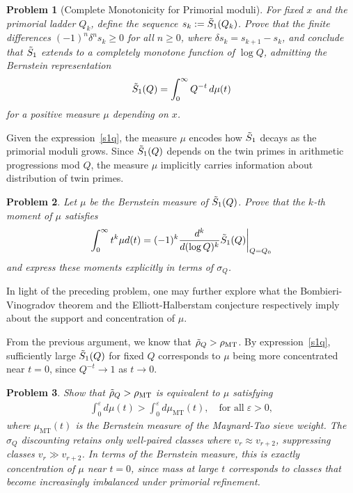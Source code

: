 \documentclass[11pt,reqno]{amsart}
\theoremstyle{plain}\newtheorem{theorem}{Theorem}[section]
\newtheorem{problem}{Problem}[section]
\numberwithin{equation}{section}
\begin{document}
\begin{problem}[Complete Monotonicity for Primorial moduli]\label{1}
For fixed $x$ and the primorial ladder $Q_k$, define the sequence $s_k:=\Tilde{S}_1(Q_k)$. Prove that the finite differences $(-1)^n \delta^n s_k \geq 0$ for all $n \geq 0$, where $\delta s_k = s_{k+1}-s_k$, and conclude that $\Tilde{S}_1$ extends to a completely monotone function of $\log Q$, admitting the Bernstein representation
\begin{align}\label{s1q}
\Tilde{S}_1(Q) 
=\int_0^\infty Q^{-t}\, d\mu(t)    
\end{align}
for a positive measure $\mu$ depending on $x$.
\end{problem}

Given the expression~\eqref{s1q}, the measure $\mu$ encodes how $\Tilde{S}_1$ decays as the primorial moduli grows. Since $\Tilde{S}_1(Q)$ depends on the twin primes in arithmetic progressions mod $Q$, the measure $\mu$ implicitly carries information about distribution of twin primes.

\begin{problem}\label{2}
Let $\mu$ be the Bernstein measure of $\Tilde{S}_1(Q)$. Prove that the $k$-th moment of $\mu$ satisfies  
\begin{align*}
\int_{0}^{\infty} t^k \mu d(t)
=(-1)^k\frac{d^k}{d(\log Q)^k}\Tilde{S}_1(Q)\bigg|_{Q=Q_0}
\end{align*}
and express these moments explicitly in terms of $\sigma_Q$. 
\end{problem}
\noindent
In light of the preceding problem, one may further explore what the Bombieri-Vinogradov theorem and the Elliott-Halberstam conjecture respectively imply about the support and concentration of $\mu$. 

From the previous argument, we know that $\Tilde{\rho}_Q>\rho_{\mathrm{MT}}$. By expression~\eqref{s1q}, sufficiently large $\Tilde{S}_1(Q)$ for fixed $Q$ corresponds to $\mu$ being more concentrated near $t=0$, since $Q^{-t}\to 1$ as $t\to 0$. 

\begin{problem}\label{3}
Show that $\Tilde{\rho}_Q>\rho_{\mathrm{MT}}$ is equivalent to $\mu$ satisfying
\begin{align*}
\int_{0}^{\varepsilon} d\mu(t)
>\int_{0}^{\varepsilon} d\mu_{\mathrm{MT}}(t), \quad\text{for all}\; \varepsilon>0,
\end{align*}
where $\mu_{\mathrm{MT}}(t)$ is the Bernstein measure of the Maynard-Tao sieve weight. The $\sigma_Q$ discounting retains only well-paired classes where $v_r\approx v_{r+2}$, suppressing classes $v_r\gg v_{r+2}$. In terms of the Bernstein measure, this is exactly concentration of $\mu$ near $t=0$, since mass at large $t$ corresponds to classes that become increasingly imbalanced under primorial refinement.
\end{problem}
\end{document}
